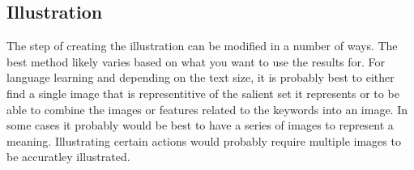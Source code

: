\documentclass[12pt]{article}
\begin{document}
\subsection{Illustration}
The step of creating the illustration can be modified in a number of ways. The best method likely varies based on what 
you want to use the results for. For language learning and depending on the text size, it is probably best to either 
find a single image that is representitive of the salient set it represents or to be able to combine the images or 
features related to the keywords into an image. In some cases it probably would be best to have a series of images 
to represent a meaning. Illustrating certain actions would probably require multiple images to be accuratley 
illustrated.
\end{document}
